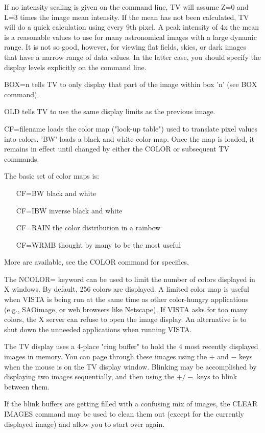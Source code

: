 If no intensity scaling is given on the command line, TV will assume Z=0
and L=3 times the image mean intensity.  If the mean has not been
calculated, TV will do a quick calculation using every 9th pixel.  A peak
intensity of 4x the mean is a reasonable values to use for many
astronomical images with a large dynamic range.  It is not so good,
however, for viewing flat fields, skies, or dark images that have a narrow
range of data values.  In the latter case, you should specify the display
levels explicitly on the command line.
 
BOX=n tells TV to only display that part of the image within box 'n'
(see BOX command).
 
OLD tells TV to use the same display limits as the previous image.
 
CF=filename loads the color map ("look-up table") used to translate
pixel values into colors.  'BW' loads a black and white color map.  Once
the map is loaded, it remains in effect until changed by either the
COLOR or subsequent TV commands.
 
The basic set of color maps is:
\begin{itemize}
  \item[CF=BW\hfill]{black and white}
  \item[CF=IBW\hfill]{inverse black and white}
  \item[CF=RAIN\hfill]{the color distribution in a rainbow}
  \item[CF=WRMB\hfill]{thought by many to be the most useful}
\end{itemize}
More are available, see the COLOR command for specifics.

The NCOLOR= keyword can be used to limit the number of colors displayed in
X windows.  By default, 256 colors are displayed.  A limited color map is
useful when VISTA is being run at the same time as other color-hungry
applications (e.g., SAOimage, or web browsers like Netscape).  If VISTA
asks for too many colors, the X server can refuse to open the image
display.  An alternative is to shut down the unneeded applications when
running VISTA.

The TV display uses a 4-place "ring buffer" to hold the 4 most recently
displayed images in memory.  You can page through these images using the
$+$ and $-$ keys when the mouse is on the TV display window.  Blinking may
be accomplished by displaying two images sequentially, and then using the
$+/-$ keys to blink between them.
 
If the blink buffers are getting filled with a confusing mix of images, the
CLEAR IMAGES command may be used to clean them out (except for the
currently displayed image) and allow you to start over again.
 

